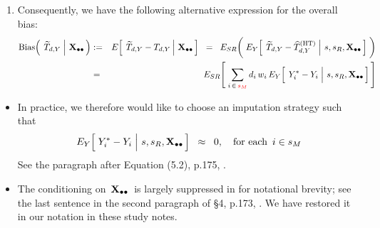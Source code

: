 \begin{lemma}
\begin{enumerate}
\begin{eqnarray*}
    & = &
        \underset{i\,\in\,{\color{red}s_{M}}}{\sum}\,d_{i}\,w_{i}\,
        E_{Y}\!\left[\;
            \left.
            Y^{*}_{i} \overset{{\color{white}.}}{-} Y_{i}
            \;\right\vert\,
            s,s_{R},\Xobs
            \,\right]
    \end{eqnarray*}
\item
    Consequently, we have the following alternative expression for the overall bias:
    \begin{eqnarray*}
    \bias\!\left(\;
        \left.
        \widetilde{T}_{d,Y}
        \;\right\vert\,
        \Xobs
        \,\right)
    & := &
        E\!\left[\;
            \left.
            \widetilde{T}_{d,Y} - T_{d,Y}
            \,\right\vert\,
            \Xobs
            \,\right]
    \;\; = \;\;
        E_{SR}\!\left(\;
            \overset{{\color{white}.}}{E_{Y}\!\left[\;
                \left.
                \widetilde{T}_{d,Y} \overset{{\color{white}.}}{-} \widehat{T}^{\textnormal{(HT)}}_{d,Y}
                \;\right\vert\,
                s,s_{R},\Xobs
                \,\right]}
            \;\right)
    \\
    & = &
        E_{SR}\!\left[\;
            \underset{i\,\in\,{\color{red}s_{M}}}{\sum}\,d_{i}\,w_{i}\,
            E_{Y}\!\left[\;
                \left.
                Y^{*}_{i} \overset{{\color{white}.}}{-} Y_{i}
                \;\right\vert\,
                s,s_{R},\Xobs
                \,\right]
            \,\right]
    \end{eqnarray*}
\end{enumerate}
\end{lemma}
\begin{remark}\label{remarkSmallUnitBias}
\mbox{}
\vskip -0.1cm
\noindent
\begin{itemize}
\item
    In practice, we therefore would like to choose an imputation strategy such that
    \begin{equation*}
    E_{Y}\!\left[\,
        \left.
        Y^{*}_{i} \overset{{\color{white}.}}{-} Y_{i}
        \;\right\vert\,
        s,s_{R},\Xobs
        \,\right]
    \;\; \approx \;\;
        0,
    \quad
    \textnormal{for each \,$i \in s_{M}$}
    \end{equation*}
    See the paragraph after Equation (5.2), p.175, \cite{Beaumont2011}.
\item
    The conditioning on \,$\mathbf{X}_{\bullet\bullet}$\, is largely suppressed in \cite{Beaumont2011} for notational brevity;
    see the last sentence in the second paragraph of \S4, p.173, \cite{Beaumont2011}.
    We have restored it in our notation in these study notes.
\end{itemize}
\end{remark}
